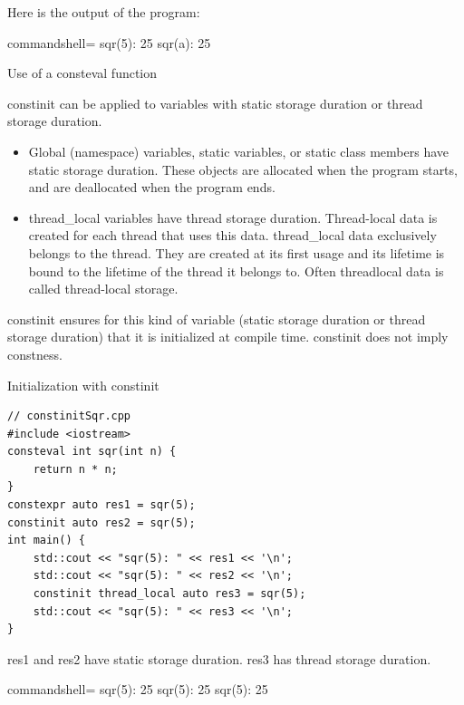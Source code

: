 Here is the output of the program:

\begin{tcblisting}{commandshell={}}
sqr(5): 25
sqr(a): 25
\end{tcblisting}

\begin{center}
Use of a consteval function
\end{center}


constinit can be applied to variables with static storage duration or thread storage duration.

\begin{itemize}
\item 
Global (namespace) variables, static variables, or static class members have static storage duration. These objects are allocated when the program starts, and are deallocated when the program ends.

\item 
thread\_local variables have thread storage duration. Thread-local data is created for each thread that uses this data. thread\_local data exclusively belongs to the thread. They are created at its first usage and its lifetime is bound to the lifetime of the thread it belongs to. Often threadlocal data is called thread-local storage.
\end{itemize}

constinit ensures for this kind of variable (static storage duration or thread storage duration) that it is initialized at compile time. constinit does not imply constness.

\noindent
Initialization with constinit
\begin{lstlisting}[style=styleCXX]
// constinitSqr.cpp
#include <iostream>
consteval int sqr(int n) {
	return n * n;
}
constexpr auto res1 = sqr(5);
constinit auto res2 = sqr(5);
int main() {
	std::cout << "sqr(5): " << res1 << '\n';
	std::cout << "sqr(5): " << res2 << '\n';
	constinit thread_local auto res3 = sqr(5);
	std::cout << "sqr(5): " << res3 << '\n';
}
\end{lstlisting}

res1 and res2 have static storage duration. res3 has thread storage duration.

\begin{tcblisting}{commandshell={}}
sqr(5): 25
sqr(5): 25
sqr(5): 25
\end{tcblisting}


